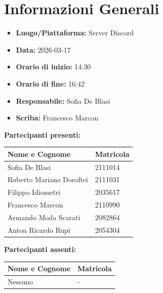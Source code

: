\section{Informazioni Generali}
\begin{itemize}
    \item \textbf{Luogo/Piattaforma:} Server Discord
    \item \textbf{Data:} 2026-03-17
    \item \textbf{Orario di inizio:} 14:30
    \item \textbf{Orario di fine:} 16:42
    \item \textbf{Responsabile:} Sofia De Blasi
    \item \textbf{Scriba:} Francesco Marcon
\end{itemize}

\vspace{0.5cm}
\textbf{Partecipanti presenti:}
\begin{table}[ht]
    \centering
    \renewcommand{\arraystretch}{1.2}
    \begin{tabularx}{\textwidth}{X l}
        \toprule
        \textbf{Nome e Cognome} & \textbf{Matricola} \\
        \midrule
        Sofia De Blasi & 2111014 \\
        Roberto Mariano Doroftei & 2111031 \\
        Filippo Idiometri & 2035617 \\
        Francesco Marcon & 2110990 \\
        Armando Moda Scarati & 2082864 \\
        Anton Ricardo Rupi & 2054304 \\
        \bottomrule
    \end{tabularx}
\end{table}

\vspace{0.5cm}
\textbf{Partecipanti assenti:}
\begin{table}[ht]
    \centering
    \renewcommand{\arraystretch}{1.2}
    \begin{tabularx}{\textwidth}{X l}
        \toprule
        \textbf{Nome e Cognome} & \textbf{Matricola} \\
        \midrule
        Nessuno & - \\
        \bottomrule
    \end{tabularx}
\end{table}

